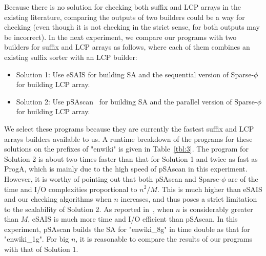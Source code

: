 \documentclass[10pt,journal,compsoc]{IEEEtran}
\begin{document}

Because there is no solution for checking both suffix and LCP arrays in the existing literature,  comparing the outputs of two builders could be a way for checking (even though it is not checking in the strict sense, for both outputs may be incorrect). In the next experiment, we compare our programs with two builders for suffix and LCP arrays as follows, where each of them combines an existing suffix sorter with an LCP builder:


\begin{itemize}
	\item Solution 1: Use eSAIS for building SA and the sequential version of Sparse-$\phi$~\cite{Karkkainen2016} for building LCP array.
	
	\item Solution 2: Use pSAscan~\cite{Karkkainen2015} for building SA and the parallel version of Sparse-$\phi$ for building LCP array.
\end{itemize}


We select these programs because they are currently the fastest suffix and LCP arrays builders available to us. A runtime breakdown of the programs for these solutions on the prefixes of "enwiki" is given in Table~\ref{tbl:3}. The program for Solution 2 is about two times faster than that for Solution 1 and twice as fast as ProgA, which is mainly due to the high speed of pSAscan in this experiment. However, it is worthy of pointing out that both pSAscan and Sparse-$\phi$ are of the time and I/O complexities proportional to $n^2/M$. This is much higher than eSAIS and our checking algorithms when $n$ increases, and thus poses a strict limitation to the scalability of Solution 2. As reported in~\cite{Karkkainen2015}, when $n$ is considerably greater than $M$, eSAIS is much more time and I/O efficient than pSAscan. In this experiment, pSAscan builds the SA for "enwiki\_8g" in time double as that for "enwiki\_1g". For big $n$, it is reasonable to compare the results of our programs with that of Solution 1.
\end{document}
